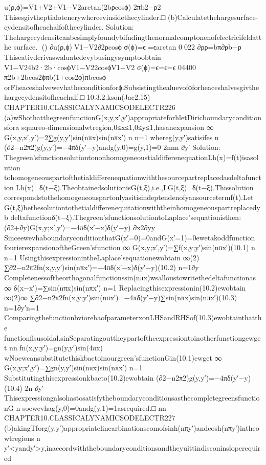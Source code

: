 {{{{{{{{{{{{u(ρ,ϕ)=V1+V2+V1−V2arctan(2bρcosϕ)
2πb2−ρ2
Thisesgivtheptialotenerywhereevinsidethecylinder.□
(b)Calculatethehargesurface-cydensitofheachalfofthecylinder.
Solution:
Thehargecydensitcanbesimplyfoundybifndingthenormalcomptonenofelectricifeldatthe
surface.
()
∂u(ρ,ϕ)V1−V2∂2ρcosϕ
σ(ϕ)=ϵ=ϵarctan
0022
∂ρρ=bπ∂ρb−ρ
Thiseativderivaswaluatedevybusingysymptoobtain
V1−V24b2·2b·cosϕV1−V22cosϕV1−V2
σ(ϕ)=ϵ=ϵ=ϵ
04400
π2b+2bcos2ϕπb(1+cos2ϕ)πbcosϕ
orFheaceshalvewevhatheconditionforϕ.Subsistingthealuevofϕforheaceshalvesgivthe
hargecydensitofheachalf.□
10.3.2.kson(Jac2.15)
CHAPTER10.CLASSICALYNAMICSODELECTR226
(a)wShothatthegreenfunctionG(x,y,x′,y′)appropriateforhletDiricboundaryconditionsfora
squareo-dimensionalwtregion,0≤x≤1,0≤y≤1,hasanexpansion
∞
G(x,y,x′,y′)=2∑g(y,y′)sin(nπx)sin(nπx′)
n
n=1
whereg(y,y′)satisifes
n
(∂2−n2π2)g(y,y′)=−4πδ(y′−y)andg(y,0)=g(y,1)=0
2nnn
∂y′
Solution:
Thegreen’sfunctionsolutiontononhomogeneoustialdifferenequationLh(x)=f(t)isasolution
tohomogeneouspartofthetialdifferenequationwiththesourcepartreplacedasdeltafunction
Lh(x)=δ(t−ξ).TheobtainedsolutionisG(t,ξ),i.e.,LG(t,ξ)=δ(t−ξ).Thissolution
correspondstothehomogeneouspartonlyasitisindeptendenofyansourcetermf(t).Let
G(t,ξ)bethesolutiontothetialdifferenequitationwiththeinhomogeneouspartreplacedyb
deltafunctionδ(t−ξ).Thegreen’sfunctionsolutiontoLaplace’sequationisthen:
(∂2+∂y)G(x,y;x′,y′)=−4πδ(x′−x)δ(y′−y)
∂x2∂yy
SinceewevhaboundaryconditionthatG(x′=0)=0andG(x′=1)=0ewetakoddfunction
fourierexpansionoftheGreen’sfunction
∞
G(x,y;x′,y′)=∑f(x,y;y′)sin(nπx′)(10.1)
n
n=1
UsingthisexpressionintheLaplace’sequationewobtain
∞(2)
∑∂2−n2π2fn(x,y,y′)sin(nπx′)=−4πδ(x′−x)δ(y′−y)(10.2)
n=1∂y
Completenessoftheorthogonalfunctionssin(nπx)wsalloustowritethedeltafunctionas
∞
δ(x−x′)=∑sin(nπx)sin(nπx′)
n=1
Replacingthisexpressionin(10.2)ewobtain
∞(2)∞
∑∂2−n2π2fn(x,y;y′)sin(nπx′)=−4πδ(y′−y)∑sin(nπx)sin(nπx′)(10.3)
n=1∂y′n=1
ComparingthefunctionbviorehaofparameterxonLHSandRHSof(10.3)ewobtainthatthe
functionfisusoidal.sinSeparatingouttheypartoftheexpressiontoinotherfunctiongewget
nn
fn(x,y;y′)=gn(y,y′)sin(4πx)
wNoewcansubstitutethiskbactoinourgreen’sfunctionGin(10.1)ewget
∞
G(x,y;x′,y′)=∑gn(y,y′)sin(nπx)sin(nπx′)
n=1
Substitutingthisexpressionkbacto(10.2)ewobtain
(∂2−n2π2)g(y,y′)=−4πδ(y′−y)(10.4)
2n
∂y′
ThisexpressiongalsohastosatisfytheboundaryconditionsasthecompletegreensfunctionG
n
soewevhag(y,0)=0andg(y,1)=1asrequired.□
nn
CHAPTER10.CLASSICALYNAMICSODELECTR227
(b)akingTforg(y,y′)appropriatelinearbinationscomofsinh(nπy′)andcosh(nπy′)intheowtregions
n
y′<yandy′>y,inaccordwiththeboundaryconditionsandtheyuittindisconinsloperequired
}}}}}}}}}}}}
